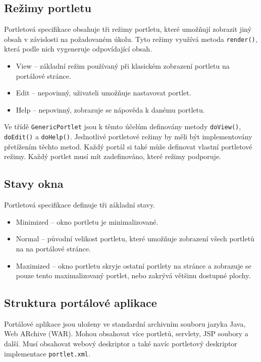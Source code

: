 \documentclass{fithesis}
\begin{document}
\subsection{Režimy portletu}
Portletová specifikace obsahuje tři režimy portletu, které umožňují zobrazit jiný obsah v závislosti na požadovaném úkolu. Tyto režimy využívá metoda \verb|render()|, která podle nich vygeneruje odpovídající obsah.

\begin{itemize}
\item View -- základní režim používaný při klasickém zobrazení portletu na portálové stránce.
\item Edit -- nepovinný, uživateli umožňuje nastavovat portlet.
\item Help -- nepovinný, zobrazuje se nápověda k danému portletu.
\end{itemize}

Ve třídě \verb|GenericPortlet| jsou k těmto účelům definovány metody \verb|doView()|, \verb|doEdit()| a \verb|doHelp()|. Jednotlivé portletové režimy by měli být implementovány přetížením těchto metod. Každý portál si také může definovat vlastní portletové režimy. Každý portlet musí mít zadefinováno, které režimy podporuje.

\subsection{Stavy okna}
Portletová specifikace definuje tři základní stavy.

\begin{itemize}
\item Minimized -- okno portletu je minimalizované.
\item Normal -- původní velikost portletu, které umožňuje zobrazení všech portletů na na portálové stránce.
\item Maximized -- okno portletu skryje ostatní portlety na stránce a zobrazuje se pouze tento maximalizovaný portlet, nebo zakrývá většinu dostupné plochy.
\end{itemize}

\subsection{Struktura portálové aplikace}
Portálové aplikace jsou uloženy ve standardní archivním souboru jazyka Java, Web ARchive (WAR). Mohou obsahovat více portletů, servlety, JSP soubory a další. Musí obsahovat webový deskriptor a také navíc portletový deskriptor implementace \verb|portlet.xml|.
\end{document}
